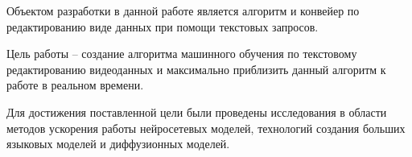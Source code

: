 \abstract %


Объектом разработки в данной работе является алгоритм и конвейер по редактированию виде данных при помощи текстовых запросов. 

Цель работы – создание алгоритма машинного обучения по текстовому редактированию видеоданных и максимально приблизить данный алгоритм к работе в реальном времени. 

Для достижения поставленной цели были проведены исследования в области методов ускорения работы нейросетевых моделей, технологий создания больших языковых моделей и диффузионных моделей. 
